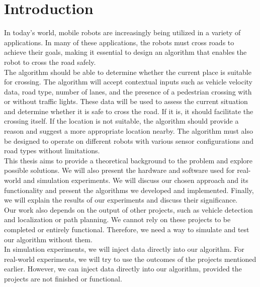 \chapter*{Introduction}
    In today's world, mobile robots are increasingly being utilized in a variety of applications. In many of these applications, the robots must cross roads to achieve their goals, making it essential to design an algorithm that enables the robot to cross the road safely.\\
    The algorithm should be able to determine whether the current place is suitable for crossing. The algorithm will accept contextual inputs such as vehicle velocity data, road type, number of lanes, and the presence of a pedestrian crossing with or without traffic lights. These data will be used to assess the current situation and determine whether it is safe to cross the road. If it is, it should facilitate the crossing itself. If the location is not suitable, the algorithm should provide a reason and suggest a more appropriate location nearby. The algorithm must also be designed to operate on different robots with various sensor configurations and road types without limitations.\\
    This thesis aims to provide a theoretical background to the problem and explore possible solutions. We will also present the hardware and software used for real-world and simulation experiments. We will discuss our chosen approach and its functionality and present the algorithms we developed and implemented. Finally, we will explain the results of our experiments and discuss their significance.\\
    Our work also depends on the output of other projects, such as vehicle detection and localization or path planning. We cannot rely on these projects to be completed or entirely functional. Therefore, we need a way to simulate and test our algorithm without them.\\
    In simulation experiments, we will inject data directly into our algorithm. For real-world experiments, we will try to use the outcomes of the projects mentioned earlier. However, we can inject data directly into our algorithm, provided the projects are not finished or functional.\\
    \newpage
